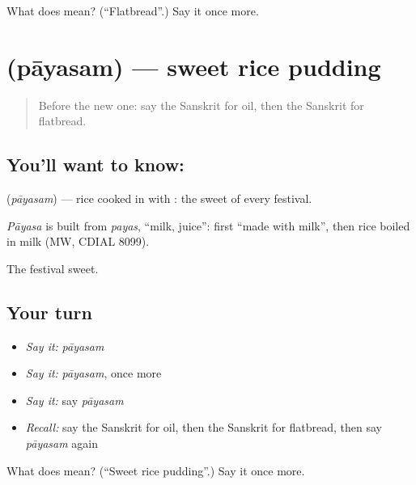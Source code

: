 \begin{tcolorbox}[breakable,colback=teal!4,colframe=teal!35!black,title={Before you move on}]
What does  mean? (\textquotedblleft{}Flatbread\textquotedblright{}.) Say it once more.
\end{tcolorbox}
\section[\texorpdfstring{\sk{पायसम्} (pāyasam)}{पायसम् (pāyasam)}]{ (pāyasam) — sweet rice pudding}

\label{lesson:SA-C78-payasam}



\begin{quote}
Before the new one: say the Sanskrit for oil, then the Sanskrit for flatbread.
\end{quote}

\subsection*{You'll want to know: }
\textbf{} (\emph{pāyasam}) — rice cooked in \textbf{} with \textbf{}: the sweet of every festival.

\begin{cousinweb}
\emph{Pāyasa} is built from \emph{payas}, \textquotedblleft{}milk, juice\textquotedblright{}: first \textquotedblleft{}made with milk\textquotedblright{}, then rice boiled in milk (MW, CDIAL 8099).
\end{cousinweb}

\begin{grammarlens}[title={What you've built}]
The festival sweet.
\end{grammarlens}

\subsection*{Your turn}
\begin{itemize}
\raggedright
  \item \emph{Say it:} \emph{pāyasam}
  \item \emph{Say it:} \emph{pāyasam}, once more
  \item \emph{Say it:} say \emph{pāyasam}
  \item \emph{Recall:} say the Sanskrit for oil, then the Sanskrit for flatbread, then say \emph{pāyasam} again
\end{itemize}

\begin{tcolorbox}[breakable,colback=teal!4,colframe=teal!35!black,title={Before you move on}]
What does  mean? (\textquotedblleft{}Sweet rice pudding\textquotedblright{}.) Say it once more.
\end{tcolorbox}
